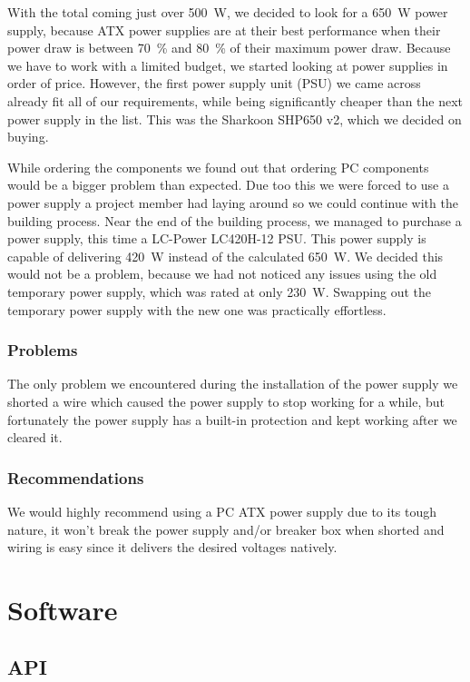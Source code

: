 \documentclass[a4paper,oneside]{book}
\begin{document}
With the total coming just over \SI{500}{\watt}, we decided to look for a
\SI{650}{\watt} power supply, because ATX power supplies are at their best
performance when their power draw is between \SI{70}{\percent} and
\SI{80}{\percent} of their maximum power draw. Because we have to work with a
limited budget, we started looking at power supplies in order of price.
However, the first power supply unit (PSU) we came across already fit all of
our requirements, while being significantly cheaper than the next power supply
in the list. This was the Sharkoon SHP650 v2, which we decided on buying.

While ordering the components we found out that ordering PC components would be
a bigger problem than expected. Due too this we were forced to use a power
supply a project member had laying around so we could continue with the
building process. Near the end of the building process, we managed to purchase
a power supply, this time a LC-Power LC420H-12 PSU. This power supply is
capable of delivering \SI{420}{\watt} instead of the calculated
\SI{650}{\watt}. We decided this would not be a problem, because we had not
noticed any issues using the old temporary power supply, which was rated at
only \SI{230}{\watt}. Swapping out the temporary power supply with the new one
was practically effortless.	

\subsection{Problems}
The only problem we encountered during the installation of the power supply we
shorted a wire which caused  the  power supply to stop working for a while, but
fortunately the power supply has a built-in protection and kept working after
we cleared it. 

\subsection{Recommendations}
We would highly recommend using a PC ATX power supply due to its tough nature,
it won't break the power supply and/or breaker box when shorted and wiring
is easy since it delivers the desired voltages natively.

\chapter{Software}
\label{ch:software}
\section{API}
\end{document}
